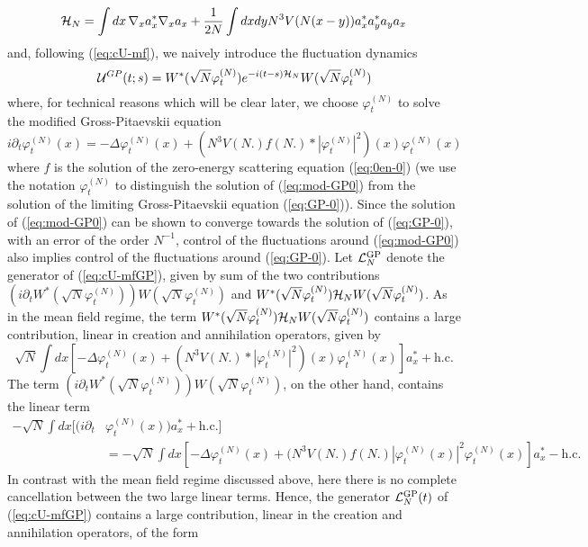\documentclass[11pt,a4paper]{article}
\newcommand{\cU}{{\cal U}}
\newcommand{\cH}{{\cal H}}
\newcommand{\cL}{{\cal L}}
\begin{document}
\begin{equation}\label{eq:cHN} \cH_N = \int dx \, \nabla_x a_x^* \nabla_x a_x + \frac{1}{2N} \int dx dy N^3 V(N (x-y)) a_x^* a_y^* a_y a_x \end{equation}
and, following (\ref{eq:cU-mf}), we naively introduce the fluctuation dynamics
\begin{equation}\label{eq:cU-mfGP} 
\cU^{GP} (t;s) = W^* (\sqrt{N} \varphi^{(N)}_t) e^{-i (t-s) \cH_N} W(\sqrt{N} \varphi^{(N)}_t) \end{equation}
where, for technical reasons which will be clear later, we choose $\varphi^{(N)}_t$ to solve the modified Gross-Pitaevskii equation 
\begin{equation}\label{eq:mod-GP0} i\partial_t \varphi^{(N)}_t (x) = -\Delta \varphi^{(N)}_t (x) + (N^3 V(N.) f(N.) * |\varphi^{(N)}_t|^2) (x) \varphi^{(N)}_t (x) \end{equation}
where $f$ is the solution of the zero-energy scattering equation (\ref{eq:0en-0}) (we use the notation $\varphi_t^{(N)}$ to distinguish the solution of (\ref{eq:mod-GP0}) from the solution of the limiting Gross-Pitaevskii equation (\ref{eq:GP-0})). Since the solution of (\ref{eq:mod-GP0}) can be shown to converge towards the solution of (\ref{eq:GP-0}), with an error of the order $N^{-1}$, control of the fluctuations around (\ref{eq:mod-GP0}) also implies control of the fluctuations around (\ref{eq:GP-0}). Let $\cL_N^{\text{GP}}$ denote the generator of (\ref{eq:cU-mfGP}), given by sum of the two contributions $(i\partial_t W^* (\sqrt{N} \varphi^{(N)}_t)) W (\sqrt{N} \varphi^{(N)}_t)$ and $W^* (\sqrt{N} \varphi^{(N)}_t) \cH_N W (\sqrt{N} \varphi^{(N)}_t)$. As in the mean field regime, the term $W^*(\sqrt{N} \varphi^{(N)}_t) \cH_N W(\sqrt{N} \varphi^{(N)}_t)$ contains a large contribution, linear in creation and annihilation operators, given by
\[ \sqrt{N} \int dx \left[ -\Delta \varphi^{(N)}_t (x) + (N^3 V (N.) * |\varphi^{(N)}_t|^2) (x) \varphi^{(N)}_t (x) \right] a_x^* + \text{h.c.} \] 
The term $(i\partial_t W^* (\sqrt{N} \varphi^{(N)}_t)) W (\sqrt{N} \varphi^{(N)}_t)$, on the other hand, contains the linear term
\[ \begin{split} 
- \sqrt{N} \int dx \big[ (i\partial_t &\varphi^{(N)}_t (x)) a_x^* + \text{h.c.}\big]  \\
&=- \sqrt{N} \int dx \left[ -\Delta \varphi^{(N)}_t (x) + (N^3 V(N.) f(N.) |\varphi^{(N)}_t (x)|^2 \varphi^{(N)}_t (x) \right] a_x^* - \text{h.c.}
\end{split}\]
In contrast with the mean field regime discussed above, here there is no complete cancellation between the two large linear terms. Hence, the generator $\cL^{\text{GP}}_N (t)$ of (\ref{eq:cU-mfGP}) contains a large contribution, linear in the creation and annihilation operators, of the form
\end{document}
